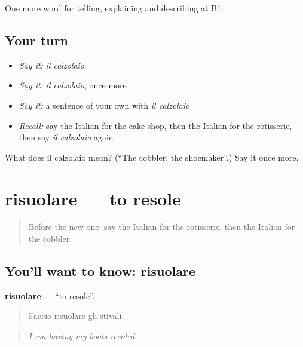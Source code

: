\begin{grammarlens}[title={What you've built}]
One more word for telling, explaining and describing at B1.
\end{grammarlens}

\subsection*{Your turn}
\begin{itemize}
\raggedright
  \item \emph{Say it:} \emph{il calzolaio}
  \item \emph{Say it:} \emph{il calzolaio}, once more
  \item \emph{Say it:} a sentence of your own with \emph{il calzolaio}
  \item \emph{Recall:} say the Italian for the cake shop, then the Italian for the rotisserie, then say \emph{il calzolaio} again
\end{itemize}

\begin{tcolorbox}[breakable,colback=teal!4,colframe=teal!35!black,title={Before you move on}]
What does il calzolaio mean? (\textquotedblleft{}The cobbler, the shoemaker\textquotedblright{}.) Say it once more.
\end{tcolorbox}
\section[risuolare]{risuolare — to resole}

\label{lesson:IT-C455-risuolare}



\begin{quote}
Before the new one: say the Italian for the rotisserie, then the Italian for the cobbler.
\end{quote}

\subsection*{You'll want to know: risuolare}
\textbf{risuolare} — \textquotedblleft{}to resole\textquotedblright{}.

\begin{quote}
Faccio risuolare gli stivali.
\end{quote}

\begin{quote}
\emph{I am having my boots resoled.}
\end{quote}

